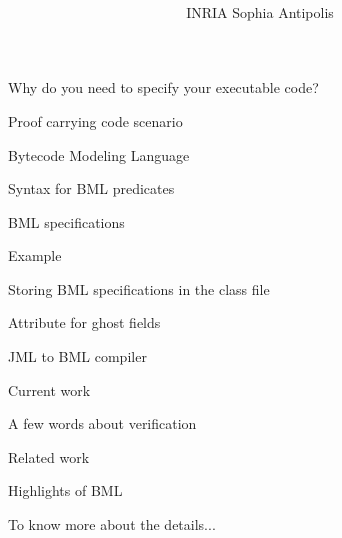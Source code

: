 \documentclass[final,nocolorBG,a4,mobius,nototal,pdf,slideColor]{prosper}
\title{\vspace*{-1em}\Blue{Bytecode Modeling Language}\bigskip\\
}
\subtitle{}
\author{  \Blue{Marieke Huisman}\\
  INRIA Sophia Antipolis}
\begin{document}
\maketitle

\begin{slide}{Why do you need to specify your executable code?}

\end{slide}

\begin{slide}{Proof carrying code scenario}

\end{slide}

\begin{slide}{Bytecode Modeling Language}

\end{slide}

\begin{slide}{Syntax for BML predicates}

\end{slide}

\begin{slide}{BML specifications}

\end{slide}

\begin{slide}{Example}

\end{slide}

\begin{slide}{Storing BML specifications in the class file}

\end{slide}

\begin{slide}{Attribute for ghost fields}

\end{slide}

\begin{slide}{JML to BML compiler}

\end{slide}

\begin{slide}{Current work}

\end{slide}

\begin{slide}{A few words about verification}

\end{slide}

\begin{slide}{Related work}

\end{slide}

\begin{slide}{Highlights of BML}

\end{slide}

\begin{slide}{To know more about the details...}

\end{slide}
\end{document}
